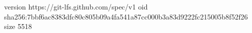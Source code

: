 version https://git-lfs.github.com/spec/v1
oid sha256:7bbf6ac8383dfc80c805b09a4fa541a87cc000b3a83d9222fc215005b8f52f26
size 5518
